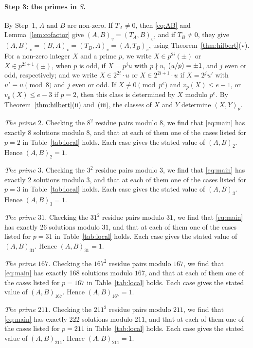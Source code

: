 \documentclass[11pt]{article}
\newcommand{\leg}[2]{\mathchoice{\biggl(\dfrac{#1}{#2}\biggr)}{(#1/#2)}{(#1/#2)}{(#1/#2)}}
\begin{document}
\paragraph{Step 3: the primes in $S$.} By Step~1, $A$ and $B$ are non-zero. If $T_A\neq0$, then \eqref{eq:AB} and Lemma~\ref{lem:cofactor} give $(A,B)_v=(T_A,B)_v$, and if $T_B\neq0$, they give $(A,B)_v=(B,A)_v=(T_B,A)_v=(A,T_B)_v$, using Theorem~\ref{thm:hilbert}(v). For a non-zero integer $X$ and a prime $p$, we write $X\in p^{2i}(\pm)$ or $X\in p^{2i+1}(\pm)$, when $p$ is odd, if $X=p^ju$ with $p\nmid u$, $\leg{u}{p}=\pm1$, and $j$ even or odd, respectively; and we write $X\in2^{2i}\cdot u$ or $X\in2^{2i+1}\cdot u$ if $X=2^ju'$ with $u'\equiv u\pmod 8$ and $j$ even or odd. If $X\not\equiv0\pmod{p^e}$ and $v_p(X)\leq e-1$, or $v_p(X)\leq e-3$ if $p=2$, then this class is determined by $X$ modulo $p^e$. By Theorem~\ref{thm:hilbert}(ii) and~(iii), the classes of $X$ and $Y$ determine $(X,Y)_p$.

\emph{The prime $2$.} Checking the $8^2$ residue pairs modulo $8$, we find that \eqref{eq:main} has exactly 8 solutions modulo $8$, and that at each of them one of the cases listed for $p=2$ in Table~\ref{tab:local} holds. Each case gives the stated value of $(A,B)_{2}$. Hence $(A,B)_{2}=1$.

\emph{The prime $3$.} Checking the $3^2$ residue pairs modulo $3$, we find that \eqref{eq:main} has exactly 2 solutions modulo $3$, and that at each of them one of the cases listed for $p=3$ in Table~\ref{tab:local} holds. Each case gives the stated value of $(A,B)_{3}$. Hence $(A,B)_{3}=1$.

\emph{The prime $31$.} Checking the $31^2$ residue pairs modulo $31$, we find that \eqref{eq:main} has exactly 26 solutions modulo $31$, and that at each of them one of the cases listed for $p=31$ in Table~\ref{tab:local} holds. Each case gives the stated value of $(A,B)_{31}$. Hence $(A,B)_{31}=1$.

\emph{The prime $167$.} Checking the $167^2$ residue pairs modulo $167$, we find that \eqref{eq:main} has exactly 168 solutions modulo $167$, and that at each of them one of the cases listed for $p=167$ in Table~\ref{tab:local} holds. Each case gives the stated value of $(A,B)_{167}$. Hence $(A,B)_{167}=1$.

\emph{The prime $211$.} Checking the $211^2$ residue pairs modulo $211$, we find that \eqref{eq:main} has exactly 222 solutions modulo $211$, and that at each of them one of the cases listed for $p=211$ in Table~\ref{tab:local} holds. Each case gives the stated value of $(A,B)_{211}$. Hence $(A,B)_{211}=1$.
\end{document}
